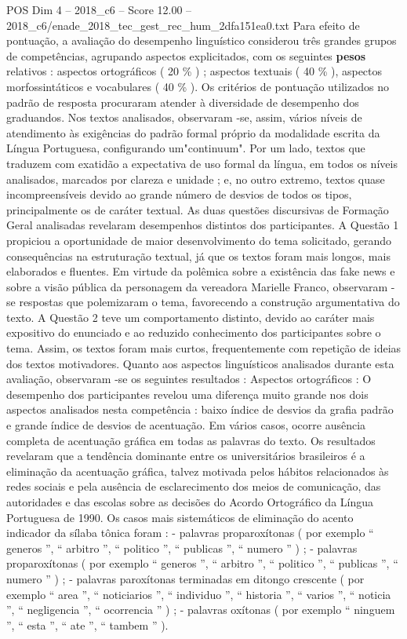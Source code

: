 \begin{textsample}{POS Dim 4 – 2018\_c6 – Score 12.00 – 2018\_c6/enade\_2018\_tec\_gest\_rec\_hum\_2dfa151ea0.txt}
Para efeito de pontuação, a avaliação do desempenho linguístico considerou três grandes grupos de competências, agrupando aspectos explicitados, com os seguintes \textbf{pesos} relativos : aspectos ortográficos ( 20 \% ) ; aspectos textuais ( 40 \% ), aspectos morfossintáticos e vocabulares ( 40 \% ).
Os critérios de pontuação utilizados no padrão de resposta procuraram atender à diversidade de desempenho dos graduandos.
Nos textos analisados, observaram -se, assim, vários níveis de atendimento às exigências do padrão formal próprio da modalidade escrita da Língua Portuguesa, configurando um"continuum".
Por um lado, textos que traduzem com exatidão a expectativa de uso formal da língua, em todos os níveis analisados, marcados por clareza e unidade ; e, no outro extremo, textos quase incompreensíveis devido ao grande número de desvios de todos os tipos, principalmente os de caráter textual.
As duas questões discursivas de Formação Geral analisadas revelaram desempenhos distintos dos participantes.
A Questão 1 propiciou a oportunidade de maior desenvolvimento do tema solicitado, gerando consequências na estruturação textual, já que os textos foram mais longos, mais elaborados e fluentes.
Em virtude da polêmica sobre a existência das fake news e sobre a visão pública da personagem da vereadora Marielle Franco, observaram -se respostas que polemizaram o tema, favorecendo a construção argumentativa do texto.
A Questão 2 teve um comportamento distinto, devido ao caráter mais expositivo do enunciado e ao reduzido conhecimento dos participantes sobre o tema.
Assim, os textos foram mais curtos, frequentemente com repetição de ideias dos textos motivadores.
Quanto aos aspectos linguísticos analisados durante esta avaliação, observaram -se os seguintes resultados : Aspectos ortográficos : O desempenho dos participantes revelou uma diferença muito grande nos dois aspectos analisados nesta competência : baixo índice de desvios da grafia padrão e grande índice de desvios de acentuação.
Em vários casos, ocorre ausência completa de acentuação gráfica em todas as palavras do texto.
Os resultados revelaram que a tendência dominante entre os universitários brasileiros é a eliminação da acentuação gráfica, talvez motivada pelos hábitos relacionados às redes sociais e pela ausência de esclarecimento dos meios de comunicação, das autoridades e das escolas sobre as decisões do Acordo Ortográfico da Língua Portuguesa de 1990.
Os casos mais sistemáticos de eliminação do acento indicador da sílaba tônica foram : - palavras proparoxítonas ( por exemplo “ generos ”, “ arbitro ”, “ politico ”, “ publicas ”, “ numero ” ) ; - palavras proparoxítonas ( por exemplo “ generos ”, “ arbitro ”, “ politico ”, “ publicas ”, “ numero ” ) ; - palavras paroxítonas terminadas em ditongo crescente ( por exemplo “ area ”, “ noticiarios ”, “ individuo ”, “ historia ”, “ varios ”, “ noticia ”, “ negligencia ”, “ ocorrencia ” ) ; - palavras oxítonas ( por exemplo “ ninguem ”, “ esta ”, “ ate ”, “ tambem ” ).

\end{textsample}
